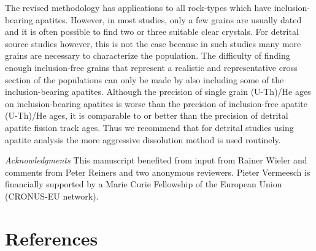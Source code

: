 \documentclass{article}
\begin{document}
The revised methodology has  applications to all rock-types which have
inclusion-bearing  apatites.  However, in  most  studies,  only a  few
grains are usually dated and it is often possible to find two or three
suitable clear crystals. For  detrital source studies however, this is
not the case because in such studies many more grains are necessary to
characterize  the   population.  The  difficulty   of  finding  enough
inclusion-free  grains that represent  a realistic  and representative
cross section  of the populations can  only be made  by also including
some  of the  inclusion-bearing  apatites. Although  the precision  of
single  grain (U-Th)/He  ages on  inclusion-bearing apatites  is worse
than  the precision of  inclusion-free apatite  (U-Th)/He ages,  it is
comparable to or better than the precision of detrital apatite fission
track ages. Thus we recommend  that for detrital studies using apatite
analysis the more aggressive dissolution method is used routinely.
\\

\newpage

{\it Acknowledgments} This manuscript benefited from input from Rainer
Wieler and comments from Peter Reiners and two anonymous reviewers. 
Pieter Vermeesch is financially supported by a Marie Curie Fellowship
of the European Union (CRONUS-EU network).

\section*{References}
\end{document}
